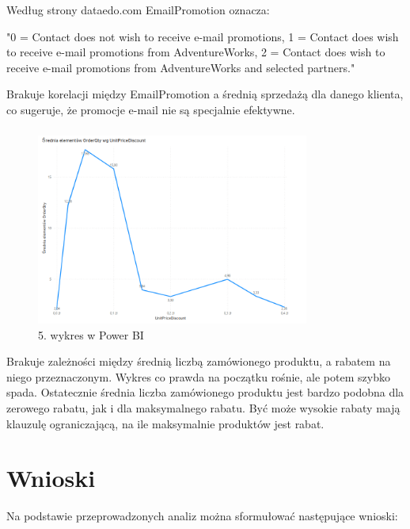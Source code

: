 \documentclass[a4paper,12pt]{article}
\begin{document}
Według strony dataedo.com \cite{adventureworks} EmailPromotion oznacza:

"0 = Contact does not wish to receive e-mail promotions, 1 = Contact does wish to receive e-mail promotions from AdventureWorks, 2 = Contact does wish to receive e-mail promotions from AdventureWorks and selected partners."

Brakuje korelacji między EmailPromotion a średnią sprzedażą dla danego klienta, co sugeruje, że promocje e-mail nie są specjalnie efektywne.

\subsubsection{}

\begin{figure}[H]
    \centering
    \includegraphics[width=0.8\textwidth]{images/power_bi/05.png}
    \caption{5. wykres w Power BI}
\end{figure}

Brakuje zależności między średnią liczbą zamówionego produktu, a rabatem na niego przeznaczonym. Wykres co prawda na początku rośnie, ale potem szybko spada. Ostatecznie średnia liczba zamówionego produktu jest bardzo podobna dla zerowego rabatu, jak i dla maksymalnego rabatu. Być może wysokie rabaty mają klauzulę ograniczającą, na ile maksymalnie produktów jest rabat.

\section{Wnioski}

Na podstawie przeprowadzonych analiz można sformułować następujące wnioski:
\end{document}
